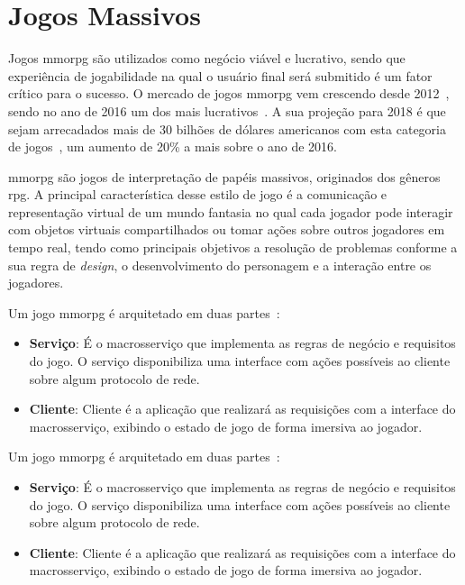 \section{Jogos Massivos}
\label{sec:mmorpg}



Jogos \ac{mmorpg} são utilizados como negócio viável e lucrativo, sendo que experiência de jogabilidade na qual o usuário final será submitido é um fator crítico para o sucesso.
%
O mercado de jogos \ac{mmorpg} vem crescendo desde 2012~\cite{new_york_times}, sendo no ano de 2016 um dos mais lucrativos~\cite{statista_2016}.
%
A sua projeção para 2018 é que sejam arrecadados mais de 30 bilhões de dólares americanos com esta categoria de jogos~\cite{statista_2018}, um aumento de 20\% a mais sobre o ano de 2016.



\ac{mmorpg} são jogos de interpretação de papéis massivos, originados dos gêneros \ac{rpg}.
%
A principal característica desse estilo de jogo é a comunicação e representação virtual de um mundo fantasia no qual cada jogador pode interagir com objetos virtuais compartilhados ou tomar ações sobre outros jogadores em tempo real, tendo como principais objetivos a resolução de problemas conforme a sua regra de \textit{design}, o desenvolvimento do personagem e a interação entre os jogadores\cite{video_game_technologies}.
%

Um jogo \ac{mmorpg} é arquitetado em duas partes~\cite{mmo_analytic}:
\begin{itemize}
  \item \textbf{Serviço}: É o macrosserviço que implementa as regras de negócio e requisitos do jogo.
  O serviço disponibiliza uma interface com ações possíveis ao cliente sobre algum protocolo de rede.
  \item \textbf{Cliente}: Cliente é a aplicação que realizará as requisições com a interface do macrosserviço, exibindo o estado de jogo de forma imersiva ao jogador.
\end{itemize}


Um jogo \ac{mmorpg} é arquitetado em duas partes~\cite{mmo_analytic}:
\begin{itemize}
  \item \textbf{Serviço}: É o macrosserviço que implementa as regras de negócio e requisitos do jogo.
  O serviço disponibiliza uma interface com ações possíveis ao cliente sobre algum protocolo de rede.
  \item \textbf{Cliente}: Cliente é a aplicação que realizará as requisições com a interface do macrosserviço, exibindo o estado de jogo de forma imersiva ao jogador.
\end{itemize}

